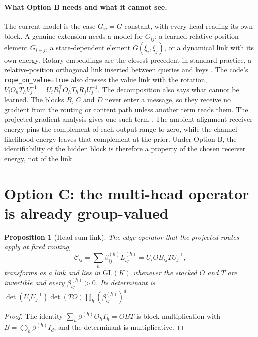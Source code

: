 \documentclass[11pt]{article}
\newtheorem{proposition}{Proposition}
\theoremstyle{definition}
\theoremstyle{remark}
\newcommand{\GL}{\mathrm{GL}}
\newcommand{\cfg}[1]{\texttt{#1}}
\begin{document}
\paragraph{What Option B needs and what it cannot see.}
The current model is the case $G_{ij}=G$ constant, with every head reading its own block. A genuine extension needs a model for $G_{ij}$: a learned relative-position element $G_{i-j}$, a state-dependent element $G(\xi_i,\xi_j)$, or a dynamical link with its own energy. Rotary embeddings are the closest precedent in standard practice, a relative-position orthogonal link inserted between queries and keys \cite{su2021roformer}. The code's \cfg{rope\_on\_value=True} also dresses the value link with the rotation, $V_iO_hT_hV_j^{-1}=U_iR_i^\top O_hT_hR_jU_j^{-1}$. The decomposition also says what cannot be learned. The blocks $B$, $C$ and $D$ never enter a message, so they receive no gradient from the routing or content path unless another term reads them. The projected gradient analysis gives one such term \cite{dennis2026projgrad}. The ambient-alignment receiver energy pins the complement of each output range to zero, while the channel-likelihood energy leaves that complement at the prior. Under Option B, the identifiability of the hidden block is therefore a property of the chosen receiver energy, not of the link.

\section{Option C: the multi-head operator is already group-valued}
\label{sec:headsum}

\begin{proposition}[Head-sum link]
\label{prop:headsum}
The edge operator that the projected routes apply at fixed routing,
\begin{equation}
\mathcal C_{ij}=\sum_h\beta_{ij}^{(h)}L_{ij}^{(h)}=U_iOB_{ij}TU_j^{-1},
\label{eq:headsum}
\end{equation}
transforms as a link and lies in $\GL(K)$ whenever the stacked $O$ and $T$ are invertible and every $\beta_{ij}^{(h)}>0$. Its determinant is $\det(U_iU_j^{-1})\det(TO)\prod_h(\beta_{ij}^{(h)})^d$.
\end{proposition}

\begin{proof}
The identity $\sum_h\beta^{(h)}O_hT_h=OB T$ is block multiplication with $B=\bigoplus_h\beta^{(h)}I_d$, and the determinant is multiplicative.
\end{proof}
\end{document}

